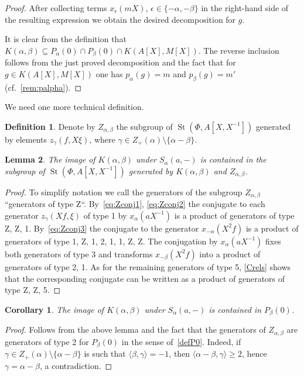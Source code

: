\documentclass[oneside, 8pt]{amsart}
\newtheorem{corollary}{Corollary}
\newtheorem{lemma}{Lemma}
\theoremstyle{remark}
\theoremstyle{definition}
\newtheorem{df}[lemma]{Definition} \Crefname{df}{Definition}{Definitions}
\DeclareMathOperator{\St}{St}
\numberwithin{equation}{section}
\begin{document}
\begin{proof}
 After collecting terms $x_\epsilon(mX)$, $\epsilon \in \{ -\alpha, -\beta \}$ in the right-hand side of the resulting expression we obtain the desired decomposition for $g$.
 
 It is clear from the definition that $K(\alpha, \beta) \subseteq P_\alpha(0) \cap P_\beta(0) \cap K(A[X], M[X])$. The reverse inclusion follows from the just proved decomposition and the fact that for $g\in K(A[X], M[X])$ one has $p_{\alpha}(g) = m$ and $p_\beta(g) = m'$ (cf.~\cref{rem:palpha}). \end{proof}
 
We need one more technical definition.
\begin{df} Denote by $Z_{\alpha, \beta}$ the subgroup of $\St(\Phi, A[X, X^{-1}])$ generated by elements $z_\gamma(f, X\xi)$, where $\gamma \in Z_+(\alpha) \setminus \{ \alpha - \beta \}$.\end{df}
  
\begin{lemma} \label{image-K-a-b} The image of $K(\alpha, \beta)$ under $S_{\alpha}(a, -)$ is contained in the subgroup of $\St(\Phi, A[X, X^{-1}])$  generated by $K(\alpha, \beta)$ and $Z_{\alpha, \beta}$. \end{lemma}
\begin{proof} To simplify notation we call the generators of the subgroup $Z_{\alpha,\beta}$ ``generators of type Z``. By~\eqref{eq:Zconj1}, \eqref{eq:Zconj2} the conjugate to each generator $z_\gamma(Xf, \xi)$ of type 1 by $x_\alpha(aX^{-1})$ is a product of generators of type Z, Z, 1.
By~\eqref{eq:Zconj3} the conjugate to the generator $x_{-\alpha}(X^2f)$ is a product of generators of type 1, Z, 1, 2, 1, 1, Z, Z.
The conjugation by $x_\alpha(aX^{-1})$ fixes both generators of type 3 and transforms $x_{-\beta}(X^2f)$ into a product of generators of type 2, 1. As for the remaining generators of type 5, \cref{Crels} shows that the corresponding conjugate can be written as a product of generators of type Z, Z, 5. \end{proof}  

\begin{corollary} The image of $K(\alpha, \beta)$ under $S_\alpha(a, -)$ is contained in $P_\beta(0)$. \end{corollary}
\begin{proof} Follows from the above lemma and the fact that the generators of $Z_{\alpha,\beta}$ are generators of type 2 for $P_\beta(0)$ in the sense of~\cref{defP0}.
 Indeed, if $\gamma \in Z_+(\alpha) \setminus \{ \alpha - \beta \}$ is such that $\langle \beta, \gamma \rangle = -1$, then $ \langle \alpha - \beta, \gamma \rangle \geq 2$, hence
  $\gamma = \alpha - \beta$, a contradiction. \end{proof}
\end{document}
